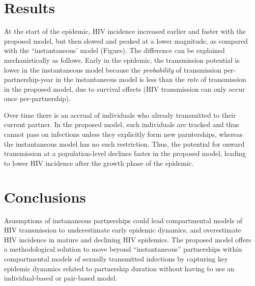 \section{Results}  %
At the start of the epidemic, HIV incidence increased earlier and faster with the proposed model, but
then slowed and peaked at a lower magnitude, as compared with the ``instantaneous'  model (Figure). 
The difference can be explained mechanistically as follows.
Early in the epidemic, the transmission potential is lower in the instantaneous model
because the \emph{probability} of transmission per-partnership-year in the instantaneous model
is less than the \emph{rate} of transmission in the proposed model,
due to survival effects (HIV transmission can only occur once per-partnership). %

Over time there is an accrual of individuals who already transmitted to their current partner. 
In the proposed model, such individuals are tracked and thus cannot pass on infections unless they explicitly form new parnterships, whereas 
the instantaneous model has no such restriction. Thus, the potential for onward transmission at a population-level declines faster in the proposed model, 
leading to lower HIV incidence after the growth phase of the epidemic.


\section{Conclusions}
Asusmptions of instananeous partnerships could lead compartmental models of HIV transmission to
underestimate early epidemic dynamics, and overestimate
HIV incidence in mature and declining HIV epidemics.
The proposed model offers a methodological solution to move beyond ``instantaneous'' partnerships
within compartmental models of sexually transmitted infections by
capturing key epidemic dynamics related to partnership duration without having to use an individual-based or pair-based model.

